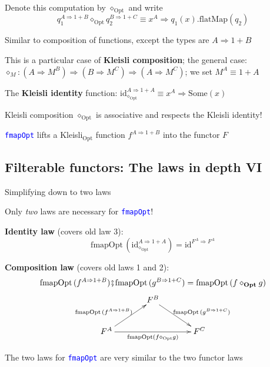 Denote this computation by $\diamond_{\text{Opt}}$ and write{\footnotesize{}
\[
q_{1}^{A\Rightarrow1+B}\diamond_{\text{Opt}}q_{2}^{B\Rightarrow1+C}\equiv x^{A}\Rightarrow q_{1}(x).\text{flatMap}\left(q_{2}\right)
\]
}{\footnotesize\par}

Similar to composition of functions, except the types are $A\Rightarrow1+B$

This is a particular case of \textbf{Kleisli composition}; the general
case: {\footnotesize{}$\diamond_{M}:(A\Rightarrow M^{B})\Rightarrow(B\Rightarrow M^{C})\Rightarrow(A\Rightarrow M^{C})$};
we set $M^{A}\equiv1+A$

The \textbf{Kleisli identity} function: $\text{id}_{\diamond_{\text{Opt}}}^{A\Rightarrow1+A}\equiv x^{A}\Rightarrow\text{Some}\left(x\right)$

Kleisli composition $\diamond_{\text{Opt}}$ is associative and respects
the Kleisli identity!

\texttt{\textcolor{blue}{\footnotesize{}fmapOpt}} lifts a Kleisli$_{\text{Opt}}$
function $f^{A\Rightarrow1+B}$ into the functor $F$


\subsection{Filterable functors: The laws in depth VI}

Simplifying down to two laws

Only \emph{two} laws are necessary for \texttt{\textcolor{blue}{\footnotesize{}fmapOpt}}!

\textbf{Identity law} (covers old law 3): {\footnotesize{}
\[
\text{fmapOpt}\,(\text{id}_{\diamond_{\text{Opt}}}^{A\Rightarrow1+A})=\text{id}^{F^{A}\Rightarrow F^{A}}
\]
}{\footnotesize\par}

\textbf{Composition law} (covers old laws 1 and 2): {\footnotesize{}
\[
\text{fmapOpt}\,(f^{A\Rightarrow1+B})\bef\text{fmapOpt}\,(g^{B\Rightarrow1+C})=\text{fmapOpt}\left(f\diamond_{\text{\textbf{Opt}}}g\right)
\]
\[
\xymatrix{\xyScaleY{2pc}\xyScaleX{3pc} & F^{B}\ar[rd]\sp(0.55){\ \text{fmapOpt}\,(g^{B\Rightarrow1+C})}\\
F^{A}\ar[ru]\sp(0.45){\text{fmapOpt}\,(f^{A\Rightarrow1+B})\ }\ar[rr]\sb(0.5){\text{fmapOpt}\left(f\diamond_{\text{Opt}}g\right)} &  & F^{C}
}
\]
}{\footnotesize\par}

The two laws for \texttt{\textcolor{blue}{\footnotesize{}fmapOpt}}
are very similar to the two functor laws

